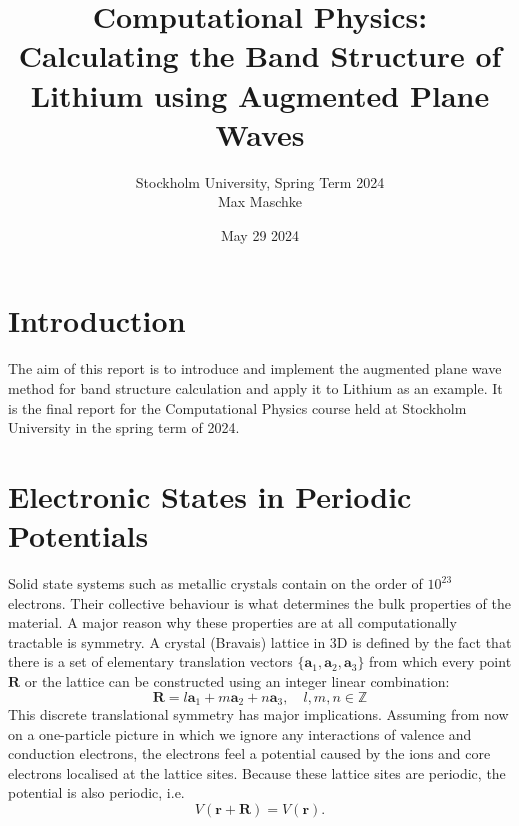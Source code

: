 \documentclass[a4paper,DIV=12,english]{scrartcl}
\title{Computational Physics: Calculating the Band Structure of Lithium using Augmented Plane Waves}
\author{Stockholm University, Spring Term 2024 \\Max Maschke}
\date{May 29 2024}
\begin{document}
\maketitle


\tableofcontents
\newpage


\newpage
\section{Introduction}
The aim of this report is to introduce and implement the augmented plane wave method for band structure calculation and apply it to Lithium as an example. It is the final report for the Computational Physics course held at Stockholm University in the spring term of 2024.

\section{Electronic States in Periodic Potentials}
Solid state systems such as metallic crystals contain on the order of $10^{23}$ electrons. Their collective behaviour is what determines the bulk properties of the material. A major reason why these properties are at all computationally tractable is symmetry. A crystal (Bravais) lattice in 3D is defined by the fact that there is a set of elementary translation vectors $\{\textbf{a}_1, \textbf{a}_2, \textbf{a}_3\}$ from which every point $\textbf{R}$ or the lattice can be constructed using an integer linear combination:
\begin{equation}
    \textbf{R} = l\textbf{a}_1 + m\textbf{a}_2 + n\textbf{a}_3, \quad l,m,n\in\mathbb{Z}
\end{equation}
This discrete translational symmetry has major implications. Assuming from now on a one-particle picture in which we ignore any interactions of valence and conduction electrons, the electrons feel a potential caused by the ions and core electrons localised at the lattice sites. Because these lattice sites are periodic, the potential is also periodic, i.e.
\begin{equation}
    V(\textbf{r} + \textbf{R}) = V(\textbf{r}).
\end{equation}
\end{document}
